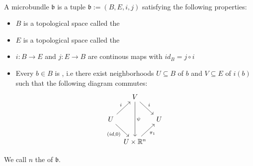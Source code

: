 \\ A microbundle $\mathfrak{b}$ is a tuple $\mathfrak{b} := (B, E, i, j)$ satisfying the following properties:
\begin{itemize}
    \item $B$ is a topological space called the 
    \item $E$ is a topological space called the 
    \item $i: B \to E$ and $j: E \to B$ are continous maps with $id_B = j \circ i$
    \item Every $b \in B$ is , i.e there exist neighborhoods $U \subseteq B$ of $b$ and $V \subseteq E$ of $i(b)$ such that the following diagram commutes:
    \[\begin{tikzcd}[column sep=tiny]
        & V \ar[dr, "i"] \ar[dd, "\psi"] & \\
        U \ar[ur, "i"] \ar[dr, "{(id, 0)}"'] & & U \\
        & U \times\R^n \ar[ur, "\pi_1"'] &
    \end{tikzcd}\]
\end{itemize}
We call $n$ the  of $\mathfrak{b}$.